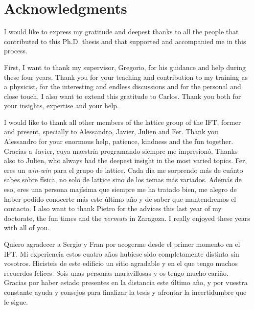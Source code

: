 
\bigskip

\begingroup
\let\clearpage\relax
\let\cleardoublepage\relax
\let\cleardoublepage\relax
\chapter*{Acknowledgments}

I would like to express my gratitude and deepest thanks to all the people that contributed to this Ph.D. thesis and that supported and accompanied me in this process.

First, I want to thank my supervisor, Gregorio, for his guidance and help during these four years. Thank you for your teaching and contribution to my training as a physicist, for the interesting and endless discussions and for the personal and close touch. I also want to extend this gratitude to Carlos. Thank you both for your insights, expertise and your help.

I would like to thank all other members of the lattice group of the IFT, former and present, specially to Alessandro, Javier, Julien and Fer. Thank you Alessandro for your enormous help, patience, kindness and the fun together. Gracias a Javier, cuya maestría programando siempre me impresionó. Thanks also to Julien, who always had the deepest insight in the most varied topics. Fer, eres un \textit{win-win} para el grupo de lattice. Cada día me sorprendo más de cuánto sabes sobre física, no solo de lattice sino de los temas más variados. Además de eso, eres una persona majísima que siempre me ha tratado bien, me alegro de haber podido conocerte más este último año y de saber que mantendremos el contacto. I also want to thank Pietro for the advices this last year of my doctorate, the fun times and the \textit{vermuts} in Zaragoza. I really enjoyed these years with all of you.

Quiero agradecer a Sergio y Fran por acogerme desde el primer momento en el IFT. Mi experiencia estos cuatro años hubiese sido completamente distinta sin vosotros. Hicisteis de este edificio un sitio agradable y en el que tengo muchos recuerdos felices. Sois unas personas maravillosas y os tengo mucho cariño. Gracias por haber estado presentes en la distancia este último año, y por vuestra constante ayuda y consejos para finalizar la tesis y afrontar la incertidumbre que le sigue.

